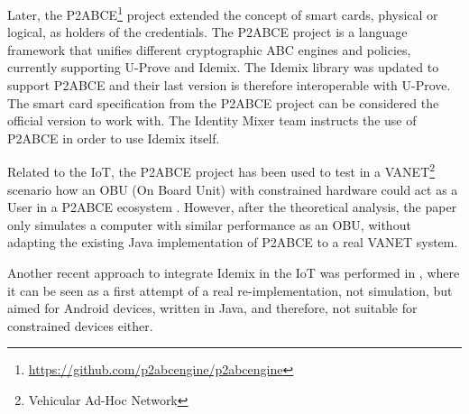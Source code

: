 
Later, the P2ABCE\footnote{\url{https://github.com/p2abcengine/p2abcengine}} project extended the concept of smart cards, physical or logical, as holders of the credentials.  The P2ABCE project is a language framework that unifies different cryptographic ABC engines and policies, currently supporting U-Prove and Idemix. The Idemix library was updated to support P2ABCE and their last version is therefore interoperable with U-Prove. The smart card specification from the P2ABCE project can be considered the official version to work with. The Identity Mixer team instructs the use of P2ABCE in order to use Idemix itself.


Related to the IoT, the P2ABCE project has been used to test in a VANET\footnote{Vehicular Ad-Hoc Network} scenario how an OBU (On Board Unit) with constrained hardware could act as a User in a P2ABCE ecosystem \cite{vanet}. However, after the theoretical analysis, the paper only simulates a computer with similar performance as an OBU, without adapting the existing Java implementation of P2ABCE to a real VANET system. 

Another recent approach to integrate Idemix in the IoT was performed in \cite{DBLP:journals/mis/BernabeRG17}, where it can be seen as a first attempt of a real re-implementation, not simulation, but aimed for Android devices, written in Java, and therefore, not suitable for constrained devices either.



